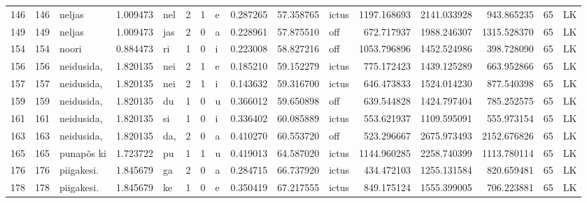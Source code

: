 \begin{tabular}{lrlrllllrrlrrrll}
146  &         146 &           neljas &  1.009473 &     nel &        2 &      1 &       e &      0.287265 &     57.358765 &  ictus &  1197.168693 &  2141.033928 &   943.865235 &     65 &        LK \\
149  &         149 &           neljas &  1.009473 &     jas &        2 &      0 &       a &      0.228961 &     57.875510 &    off &   672.717937 &  1988.246307 &  1315.528370 &     65 &        LK \\
154  &         154 &            noori &  0.884473 &      ri &        1 &      0 &       i &      0.223008 &     58.827216 &    off &  1053.796896 &  1452.524986 &   398.728090 &     65 &        LK \\
156  &         156 &       neidusida, &  1.820135 &     nei &        2 &      1 &       e &      0.185210 &     59.152279 &  ictus &   775.172423 &  1439.125289 &   663.952866 &     65 &        LK \\
157  &         157 &       neidusida, &  1.820135 &     nei &        2 &      1 &       i &      0.143632 &     59.316700 &  ictus &   646.473833 &  1524.014230 &   877.540398 &     65 &        LK \\
159  &         159 &       neidusida, &  1.820135 &      du &        1 &      0 &       u &      0.366012 &     59.650898 &    off &   639.544828 &  1424.797404 &   785.252575 &     65 &        LK \\
161  &         161 &       neidusida, &  1.820135 &      si &        1 &      0 &       i &      0.336402 &     60.085889 &  ictus &   553.621937 &  1109.595091 &   555.973154 &     65 &        LK \\
163  &         163 &       neidusida, &  1.820135 &     da, &        2 &      0 &       a &      0.410270 &     60.553720 &    off &   523.296667 &  2675.973493 &  2152.676826 &     65 &        LK \\
165  &         165 &       punapõs ki &  1.723722 &      pu &        1 &      1 &       u &      0.419013 &     64.587020 &  ictus &  1144.960285 &  2258.740399 &  1113.780114 &     65 &        LK \\
176  &         176 &       piigakesi. &  1.845679 &      ga &        2 &      0 &       a &      0.284715 &     66.737920 &  ictus &   434.472103 &  1255.131584 &   820.659481 &     65 &        LK \\
178  &         178 &       piigakesi. &  1.845679 &      ke &        1 &      0 &       e &      0.350419 &     67.217555 &  ictus &   849.175124 &  1555.399005 &   706.223881 &     65 &        LK \\

\end{tabular}
